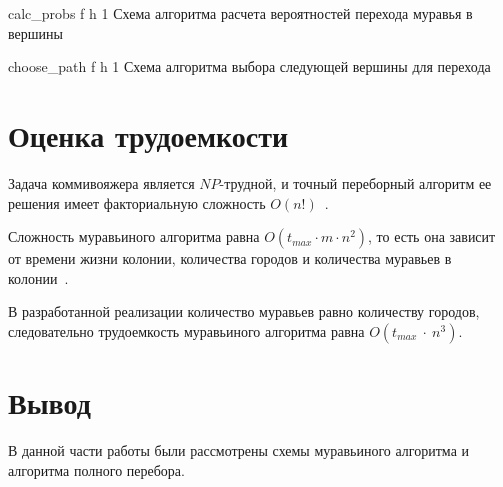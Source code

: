 {calc_probs} %
{f} %
{h} %
{1\textwidth} %
{Схема алгоритма расчета вероятностей перехода муравья в вершины} %

{choose_path} %
{f} %
{h} %
{1\textwidth} %
{Схема алгоритма выбора следующей вершины для перехода} %

\section{Оценка трудоемкости}
Задача коммивояжера является $NP$-трудной, и точный переборный алгоритм ее решения имеет факториальную сложность $O(n!)$~\cite{salesman}. 

Сложность муравьиного алгоритма равна $O(t_{max} \cdot m \cdot n^2)$, то есть она зависит от времени жизни колонии, количества городов и количества муравьев в колонии~\cite{ulyanov}. 

В разработанной реализации количество муравьев равно количеству городов, следовательно трудоемкость муравьиного алгоритма равна $O(t_{max}~\cdot~n^3)$.

\section*{Вывод}
В данной части работы были рассмотрены схемы муравьиного алгоритма и алгоритма полного перебора.
